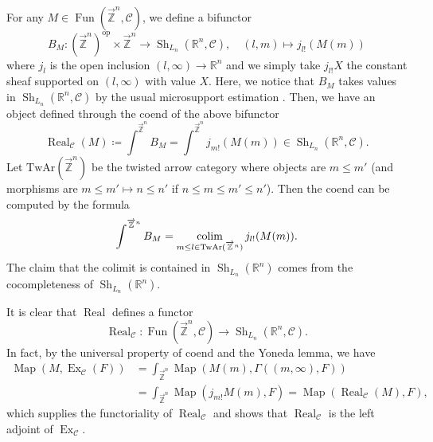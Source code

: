 \documentclass[11pt]{amsart}
\numberwithin{equation}{section}
\theoremstyle{plain}
\theoremstyle{definition}
\theoremstyle{remark}
\newcommand{\bR} { {\mathbb{R}}}
\newcommand{\cC} { {\mathcal{C}}}
\newcommand{\Sh} { {\operatorname{Sh}}}
\newcommand{\colim}{\operatornamewithlimits{colim}}
\newcommand\Fun{\operatorname{Fun}}
\newcommand{\Map}{{\operatorname{Map}}}
\newcommand{\op}{{\operatorname{op}}}
\newcommand{\rarbZ} { \overrightarrow{\mathbb{Z}}}
\newcommand{\Ex}{\operatorname{Ex}}
\newcommand{\Real}{\operatorname{Real}}
\begin{document}
For any $M\in \Fun(\rarbZ^n,\cC)$, we define a bifunctor
\[B_M: (\rarbZ^n)^\op\times \rarbZ^n \to \Sh_{L_n}(\bR^n,\cC),\quad (l,m)\mapsto  j_{l!}(M(m))\]
where $j_l$ is the open inclusion $(l,\infty)\to \bR^n $ and we simply take $j_{l!}X$ the constant sheaf supported on $(l,\infty)$ with value $X$. Here, we notice that $B_M$ takes values in $\Sh_{L_n}(\bR^n,\cC)$ by the usual microsupport estimation \cite[Proposition 5.4.1 \& 5.4.8]{KS90}.
Then, we have an object defined through the coend of the above bifunctor \cite[Section 5]{GrothPontoShulman}
\[\Real_\cC(M)\coloneqq \int^{\rarbZ^n}B_M = \int^{\rarbZ^n} j_{m!}(M(m))\in \Sh_{L_n}(\bR^n,\cC).\]
Let $\mathrm{TwAr}(\rarbZ^n)$ be the twisted arrow category where objects are $m \leq m'$ (and morphisms are $m\leq m' \mapsto n \leq n'$ if $n \leq m \leq m'\leq n'$). Then the coend can be computed by the formula
\[\int^{\rarbZ^n}B_M = \colim_{m\leq l \in \mathrm{TwAr}(\rarbZ^n)}j_{l!}(M(m)).\]
The claim that the colimit is contained in $\Sh_{L_n}(\bR^n)$ comes from the cocompleteness of $\Sh_{L_n}(\bR^n)$. 


It is clear that $\Real$ defines a functor
\[\Real_\cC: \Fun(\rarbZ^n,\cC) \to \Sh_{L_n}(\bR^n,\cC).\]
In fact, by the universal property of coend and the Yoneda lemma, we have
\begin{align*}
\Map(M,\Ex_\cC(F))&=\int_{\rarbZ^n}\Map(M(m),\Gamma((m,\infty),F))\\
   &=\int_{\rarbZ^n}\Map(j_{m!}M(m),F) =\Map(\Real_\cC(M),F),
\end{align*}
which supplies the functoriality of $\Real_\cC$ and shows that $\Real_\cC$ is the left adjoint of $\Ex_\cC$. 
\end{document}
